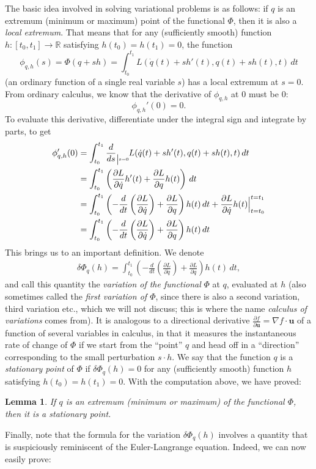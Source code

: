\documentclass[12pt]{amsart}
\newcommand{\eq}[1]{\begin{equation}\begin{split}#1\end{split}\end{equation}}
\newcommand{\eqst}[1]{\begin{align*}#1\end{align*}}
\newcommand{\der}[2]{\frac{d#1}{d#2}}
\newcommand{\pder}[2]{\frac{\partial#1}{\partial#2}}
\newcommand{\R}{\mathbb{R}}
\newtheorem{lem}[thm]{Lemma}
\begin{document}
The basic idea involved in solving variational problems is as follows: if $q$ is an extremum (minimum or maximum) point of the functional $\Phi$, then it is also a \emph{local extremum}. That means that for any (sufficiently smooth) function $h:[t_0,t_1]\to \R$ satisfying $h(t_0)=h(t_1)=0$, the function
$$ \phi_{q,h}(s) = \Phi(q+s h)=\int_{t_0}^{t_1} L(\dot{q}(t)+sh'(t),q(t)+sh(t),t)\,dt  $$
(an ordinary function of a single real variable $s$) has a local extremum at $s=0$. From ordinary calculus, we know that the derivative of $\phi_{q,h}$ at $0$ must be $0$:
$$ \phi_{q,h}'(0) = 0. $$
To evaluate this derivative, differentiate under the integral sign and integrate by parts, to get
\eqst{
\phi_{q,h}'(0) 
&=
\int_{t_0}^{t_1} \der{}{s} \raisebox{-6pt}{\tiny \Big|s=0}  L(\dot{q}(t)+sh'(t),q(t)+sh(t),t)\,dt
\\
&= \int_{t_0}^{t_1} \left(\pder{L}{\dot{q}} h'(t) + \pder{L}{q} h(t) \right)\,dt
\\ &=
\int_{t_0}^{t_1} \left(-\der{}{t}\left(\pder{L}{\dot{q}}\right) + \pder{L}{q} \right)h(t)\,dt
+ \pder{L}{\dot{q}} h(t)\Big|_{t=t_0}^{t=t_1}
\\ &= \int_{t_0}^{t_1} \left(-\der{}{t}\left(\pder{L}{\dot{q}}\right) + \pder{L}{q} \right)h(t)\,dt
}
This brings us to an important definition. We denote
\eq{ \label{eq:first-variation}
\delta\Phi_q(h) = \int_{t_0}^{t_1} \left(-\der{}{t}\left(\pder{L}{\dot{q}}\right) + \pder{L}{q} \right)h(t)\,dt,
}
and call this quantity the \emph{variation of the functional} $\Phi$ at $q$, evaluated at $h$ (also sometimes called the \emph{first variation of $\Phi$}, since there is also a second variation, third variation etc., which we will not discuss; this is where the name \emph{calculus of variations} comes from). It is analogous to a directional derivative $\pder{f}{\mathbf{u}} = \nabla f \cdot \mathbf{u}$ of a function of several variables in calculus, in that it measures the instantaneous rate of change of $\Phi$ if we start from the ``point'' $q$ and head off in a ``direction'' corresponding to the small perturbation $s\cdot h$. We say that the function $q$ is a \emph{stationary point} of $\Phi$ if $\delta\Phi_q(h) = 0$ for any (sufficiently smooth) function $h$ satisfying $h(t_0)=h(t_1)=0$. With the computation above, we have proved:

\begin{lem} If $q$ is an extremum (minimum or maximum) of the functional $\Phi$, then it is a stationary point.
\end{lem}

Finally, note that the formula for the variation $\delta \Phi_q(h)$ involves a quantity that is suspiciously reminiscent of the Euler-Langrange equation. Indeed, we can now easily prove:
\end{document}
